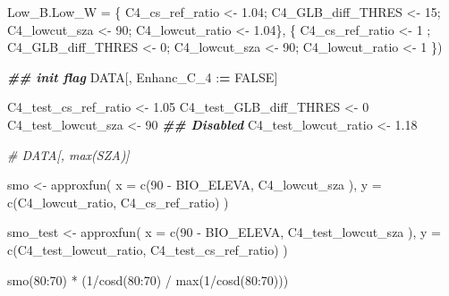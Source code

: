 \documentclass[
  10pt,
  a4paper,oneside]{article}
\newenvironment{Shaded}{\begin{snugshade}}{\end{snugshade}}
\newcommand{\AttributeTok}[1]{\textcolor[rgb]{0.77,0.63,0.00}{#1}}
\newcommand{\CommentTok}[1]{\textcolor[rgb]{0.56,0.35,0.01}{\textit{#1}}}
\newcommand{\ConstantTok}[1]{\textcolor[rgb]{0.00,0.00,0.00}{#1}}
\newcommand{\DecValTok}[1]{\textcolor[rgb]{0.00,0.00,0.81}{#1}}
\newcommand{\DocumentationTok}[1]{\textcolor[rgb]{0.56,0.35,0.01}{\textbf{\textit{#1}}}}
\newcommand{\ErrorTok}[1]{\textcolor[rgb]{0.64,0.00,0.00}{\textbf{#1}}}
\newcommand{\FloatTok}[1]{\textcolor[rgb]{0.00,0.00,0.81}{#1}}
\newcommand{\FunctionTok}[1]{\textcolor[rgb]{0.00,0.00,0.00}{#1}}
\newcommand{\NormalTok}[1]{#1}
\newcommand{\OtherTok}[1]{\textcolor[rgb]{0.56,0.35,0.01}{#1}}
\newcommand{\SpecialCharTok}[1]{\textcolor[rgb]{0.00,0.00,0.00}{#1}}
\begin{document}
\begin{Shaded}
\begin{Highlighting}[]
       \AttributeTok{Low\_B.Low\_W     =}\NormalTok{ \{ C4\_cs\_ref\_ratio }\OtherTok{\textless{}{-}} \FloatTok{1.04}\NormalTok{; C4\_GLB\_diff\_THRES }\OtherTok{\textless{}{-}} \DecValTok{15}\NormalTok{; C4\_lowcut\_sza }\OtherTok{\textless{}{-}} \DecValTok{90}\NormalTok{; C4\_lowcut\_ratio }\OtherTok{\textless{}{-}} \FloatTok{1.04}\NormalTok{\},}
\NormalTok{                         \{ C4\_cs\_ref\_ratio }\OtherTok{\textless{}{-}} \DecValTok{1}\NormalTok{   ; C4\_GLB\_diff\_THRES }\OtherTok{\textless{}{-}}  \DecValTok{0}\NormalTok{; C4\_lowcut\_sza }\OtherTok{\textless{}{-}} \DecValTok{90}\NormalTok{; C4\_lowcut\_ratio }\OtherTok{\textless{}{-}} \DecValTok{1}\NormalTok{   \})}


\DocumentationTok{\#\# init flag}
\NormalTok{DATA[, Enhanc\_C\_4 }\SpecialCharTok{:}\ErrorTok{=} \ConstantTok{FALSE}\NormalTok{]}

\NormalTok{C4\_test\_cs\_ref\_ratio   }\OtherTok{\textless{}{-}}  \FloatTok{1.05}
\NormalTok{C4\_test\_GLB\_diff\_THRES }\OtherTok{\textless{}{-}}  \DecValTok{0}
\NormalTok{C4\_test\_lowcut\_sza     }\OtherTok{\textless{}{-}} \DecValTok{90}  \DocumentationTok{\#\# Disabled}
\NormalTok{C4\_test\_lowcut\_ratio   }\OtherTok{\textless{}{-}}  \FloatTok{1.18}

\CommentTok{\# DATA[, max(SZA)]}

\NormalTok{smo }\OtherTok{\textless{}{-}} \FunctionTok{approxfun}\NormalTok{(}
  \AttributeTok{x =} \FunctionTok{c}\NormalTok{(}\DecValTok{90} \SpecialCharTok{{-}}\NormalTok{ BIO\_ELEVA,  C4\_lowcut\_sza  ),}
  \AttributeTok{y =} \FunctionTok{c}\NormalTok{(C4\_lowcut\_ratio, C4\_cs\_ref\_ratio)}
\NormalTok{)}

\NormalTok{smo\_test }\OtherTok{\textless{}{-}} \FunctionTok{approxfun}\NormalTok{(}
  \AttributeTok{x =} \FunctionTok{c}\NormalTok{(}\DecValTok{90} \SpecialCharTok{{-}}\NormalTok{ BIO\_ELEVA,       C4\_test\_lowcut\_sza  ),}
  \AttributeTok{y =} \FunctionTok{c}\NormalTok{(C4\_test\_lowcut\_ratio, C4\_test\_cs\_ref\_ratio)}
\NormalTok{)}

\FunctionTok{smo}\NormalTok{(}\DecValTok{80}\SpecialCharTok{:}\DecValTok{70}\NormalTok{) }\SpecialCharTok{*}\NormalTok{ (}\DecValTok{1}\SpecialCharTok{/}\FunctionTok{cosd}\NormalTok{(}\DecValTok{80}\SpecialCharTok{:}\DecValTok{70}\NormalTok{) }\SpecialCharTok{/} \FunctionTok{max}\NormalTok{(}\DecValTok{1}\SpecialCharTok{/}\FunctionTok{cosd}\NormalTok{(}\DecValTok{80}\SpecialCharTok{:}\DecValTok{70}\NormalTok{)))}
\end{Highlighting}
\end{Shaded}
\end{document}
